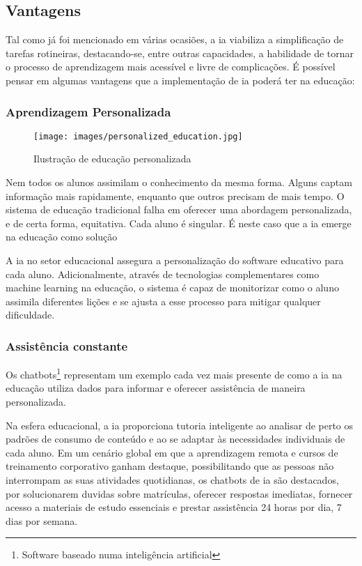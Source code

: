 \documentclass[a4paper, 11pt, onecolumn, oneside]{report}
\begin{document}
\subsection{Vantagens}
Tal como já foi mencionado em várias ocasiões, a \ac{ia} viabiliza a simplificação de tarefas rotineiras, destacando-se, entre outras capacidades, a habilidade de tornar o processo de aprendizagem mais acessível e livre de complicações. É possível pensar em algumas vantagens que a implementação de \ac{ia} poderá ter na educação:

\subsubsection{Aprendizagem Personalizada}
%
\begin{wrapfigure}{l}{0.45\textwidth}
    \texttt{[image: images/personalized\_education.jpg]}
    \caption{Ilustração de educação personalizada\cite{i33}}
    \vspace{4mm}
    \label{personalized_education}
\end{wrapfigure}
%
Nem todos os alunos assimilam o conhecimento da mesma forma. Alguns captam informação mais rapidamente, enquanto que outros precisam de mais tempo. O sistema de educação tradicional falha em oferecer uma abordagem personalizada, e de certa forma, equitativa. Cada aluno é singular. É neste caso que a \ac{ia} emerge na educação como solução
\par
A \ac{ia} no setor educacional assegura a personalização do software educativo para cada aluno. Adicionalmente, através de tecnologias complementares como machine learning na educação, o sistema é capaz de monitorizar como o aluno assimila diferentes lições e se ajusta a esse processo para mitigar qualquer dificuldade.

\subsubsection{Assistência constante}
Os chatbots\footnote{Software baseado numa inteligência artificial} representam um exemplo cada vez mais presente de como a \ac{ia} na educação utiliza dados para informar e oferecer assistência de maneira personalizada.
\par
Na esfera educacional, a \ac{ia} proporciona tutoria inteligente ao analisar de perto os padrões de consumo de conteúdo e ao se adaptar às necessidades individuais de cada aluno. Em um cenário global em que a aprendizagem remota e cursos de treinamento corporativo ganham destaque, possibilitando que as pessoas não interrompam as suas atividades quotidianas, os chatbots de \ac{ia} são destacados, por solucionarem duvidas sobre matrículas, oferecer respostas imediatas, fornecer acesso a materiais de estudo essenciais e prestar assistência 24 horas por dia, 7 dias por semana.
\end{document}
